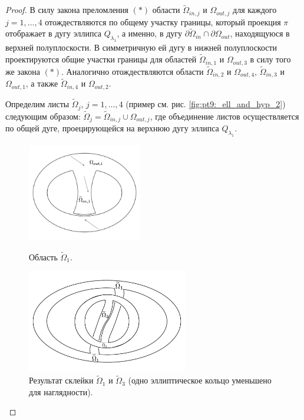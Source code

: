 \begin{proof}
В силу закона преломления $(\ast)$ области $\widetilde{\Omega}_{in, j}$ и $\Omega_{out, j}$ для каждого $j=1,\ldots, 4$ отождествляются по общему участку границы, который проекция $\pi$ отображает в дугу эллипса $Q_{\lambda_1}$, а именно, в дугу $\partial \widetilde{\Omega}_{in} \cap \partial \Omega_{out}$, находящуюся в верхней полуплоскости.
В симметричную ей дугу в нижней полуплоскости проектируются общие участки границы для областей $\widetilde{\Omega}_{in, 1}$ и $\Omega_{out, 3}$ в силу того же закона $(\ast)$. Аналогично отождествляются области $\widetilde{\Omega}_{in, 2}$ и $\Omega_{out, 4}$, $\widetilde{\Omega}_{in, 3}$ и $\Omega_{out, 1}$, а также $\widetilde{\Omega}_{in, 4}$ и $\Omega_{out, 2}$.

Определим листы $\widetilde{\Omega}_j$, $j=1, \ldots, 4$ (пример см. рис. \ref{fig:pt9:_ell_and_hyp_2}) следующим образом: 
$\widetilde{\Omega}_j = \widetilde{\Omega}_{in, j} \cup \Omega_{out, j}$, где объединение листов осуществляется по общей дуге, проецирующейся на верхнюю дугу эллипса $Q_{\lambda_1}$.

\begin{figure}[!htb]
\centering
\includegraphics[width=5cm]{images/section2/ell_and_hyp2.pdf}
    \caption{Область $\widetilde{\Omega}_1$.}
    \label{fig:pt9:_ell_and_hyp_2}
\endminipage\hfill
{}
\centering
\includegraphics[width=7cm]{images/section2/ell_and_hyp2_permutations.pdf}
    \caption{Результат склейки $\widetilde{\Omega}_1$ и $\widetilde{\Omega}_3$ (одно эллиптическое кольцо уменьшено для наглядности).}
    \label{fig:pt9:_ell_and_hyp2_permutations}
\endminipage\hfill
\end{figure}


\end{proof}
